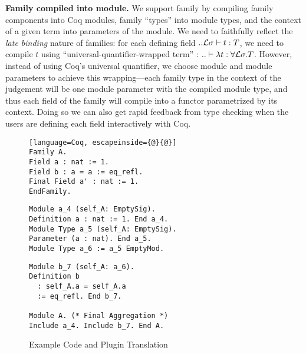 \textbf{Family compiled into module.} We support family by compiling
family components into Coq modules, family ``types'' into module types, and the context of a given term
into parameters of the module. We need to faithfully
reflect the \textit{late binding} nature of families: for each defining
field $ .. {\mathcal{L}}\sigma \vdash t : T $, we need to compile $t$ using
``universal-quantifier-wrapped term'' : $.. \vdash \lambda t : \forall
{\mathcal{L}} \sigma. T$. However, instead of using Coq's universal quantifier, we
choose module and module parameters to achieve this wrapping---each
family type in the context of the judgement will be one module parameter
with the compiled module type, and thus each field of the family will
compile into a functor parametrized by its context. Doing so we can also
get rapid feedback from type checking when the users are defining each
field interactively with Coq.
\begin{figure}[!htb]
  \begin{minipage}[t]{0.30\linewidth}
\begin{lstlisting}[language=Coq, escapeinside={@}{@}]
Family A.
Field a : nat := 1.
Field b : a = a := eq_refl.
Final Field a' : nat := 1. 
EndFamily.
\end{lstlisting}
  \end{minipage}%
  \begin{minipage}[t]{0.35\linewidth}
\begin{verbatim}
Module a_4 (self_A: EmptySig).
Definition a : nat := 1. End a_4.
Module Type a_5 (self_A: EmptySig).
Parameter (a : nat). End a_5.
Module Type a_6 := a_5 EmptyMod.
\end{verbatim}
  \end{minipage}
  \begin{minipage}[t]{0.3\linewidth}
\begin{verbatim}
Module b_7 (self_A: a_6).
Definition b 
  : self_A.a = self_A.a 
  := eq_refl. End b_7.
  
Module A. (* Final Aggregation *)
Include a_4. Include b_7. End A.
\end{verbatim}
  \end{minipage}
  \caption{Example Code and Plugin Translation}\label{fig:plugin-example1}
\end{figure}


